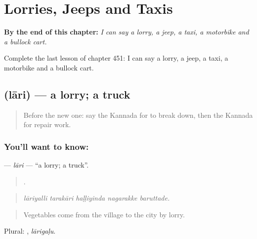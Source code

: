 
\chapter{Lorries, Jeeps and Taxis}
\label{ch:ka-lorries-jeeps-and-taxis}

\begin{chapteropening}
\textbf{By the end of this chapter:} \emph{I can say a lorry, a jeep, a taxi, a motorbike and a bullock cart.}

Complete the last lesson of chapter 451: I can say a lorry, a jeep, a taxi, a motorbike and a bullock cart.
\end{chapteropening}

\section[\texorpdfstring{\kn{ಲಾರಿ} (lāri)}{ಲಾರಿ (lāri)}]{ (lāri) — a lorry; a truck}

\label{lesson:KA-C451-lari}



\begin{quote}
Before the new one: say the Kannada for to break down, then the Kannada for repair work.
\end{quote}

\subsection*{You'll want to know: }
\textbf{} — \emph{lāri} — \textquotedblleft{}a lorry; a truck\textquotedblright{}.

\begin{quote}
    .
\end{quote}

\begin{quote}
\emph{lāriyalli tarakāri haḷḷiyinda nagarakke baruttade.}
\end{quote}

\begin{quote}
Vegetables come from the village to the city by lorry.
\end{quote}

Plural: , \emph{lārigaḷu}.

